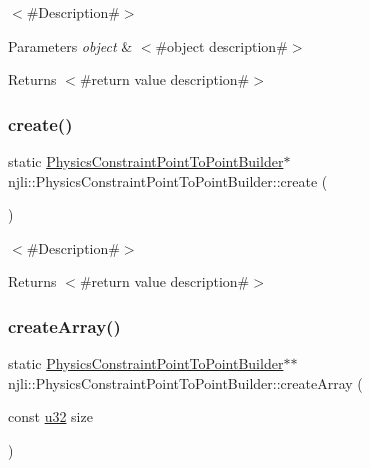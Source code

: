 $<$\#\+Description\#$>$


\begin{DoxyParams}{Parameters}
{\em object} & $<$\#object description\#$>$\\
\hline
\end{DoxyParams}
\begin{DoxyReturn}{Returns}
$<$\#return value description\#$>$ 
\end{DoxyReturn}
\mbox{\label{classnjli_1_1_physics_constraint_point_to_point_builder_a9188b738b38a4e3cd498de1b74e559c6}} 
\subsubsection{\texorpdfstring{create()}{create()}}
{\footnotesize\ttfamily static \mbox{\hyperlink{classnjli_1_1_physics_constraint_point_to_point_builder}{Physics\+Constraint\+Point\+To\+Point\+Builder}}$\ast$ njli\+::\+Physics\+Constraint\+Point\+To\+Point\+Builder\+::create (\begin{DoxyParamCaption}{ }\end{DoxyParamCaption})\hspace{0.3cm}{\ttfamily [static]}}

$<$\#\+Description\#$>$

\begin{DoxyReturn}{Returns}
$<$\#return value description\#$>$ 
\end{DoxyReturn}
\mbox{\label{classnjli_1_1_physics_constraint_point_to_point_builder_a1fb76f2a849d7f2a659d82a0ea509a93}} 
\subsubsection{\texorpdfstring{create\+Array()}{createArray()}}
{\footnotesize\ttfamily static \mbox{\hyperlink{classnjli_1_1_physics_constraint_point_to_point_builder}{Physics\+Constraint\+Point\+To\+Point\+Builder}}$\ast$$\ast$ njli\+::\+Physics\+Constraint\+Point\+To\+Point\+Builder\+::create\+Array (\begin{DoxyParamCaption}\item[{const \mbox{\hyperlink{_util_8h_a10e94b422ef0c20dcdec20d31a1f5049}{u32}}}]{size }\end{DoxyParamCaption})\hspace{0.3cm}{\ttfamily [static]}}

